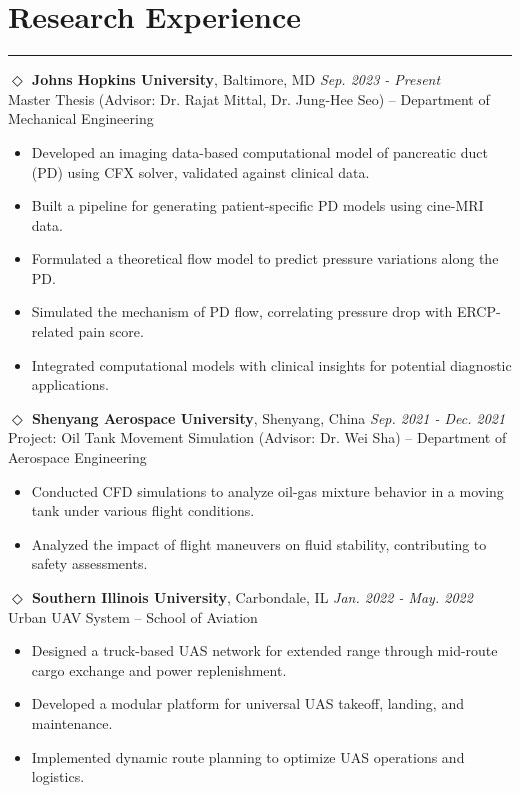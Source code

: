 \documentclass[11pt]{article}
\begin{document}
\section*{Research Experience}
\hrule

\noindent  \textbf{$\Diamond$ Johns Hopkins University}, Baltimore, MD \hfill \textit{Sep. 2023 - Present} \\
Master Thesis (Advisor: Dr. Rajat Mittal, Dr. Jung-Hee Seo) – Department of Mechanical Engineering
\begin{itemize}[leftmargin=*,itemsep=1pt]

    \item Developed an imaging data-based computational model of pancreatic duct (PD) using CFX solver, validated against clinical data. 
    \item Built a pipeline for generating patient-specific PD models using cine-MRI data.
    \item Formulated a theoretical flow model to predict pressure variations along the PD. 
    \item Simulated the mechanism of PD flow, correlating pressure drop with ERCP-related pain score.
    \item Integrated computational models with clinical insights for potential diagnostic applications. 

\end{itemize}


\noindent\textbf{$\Diamond$ Shenyang Aerospace University}, Shenyang, China \hfill \textit{Sep. 2021 - Dec. 2021} \\
Project: Oil Tank Movement Simulation (Advisor: Dr. Wei Sha) – Department of Aerospace Engineering 
\begin{itemize}[leftmargin=*,itemsep=1pt] 
    \item Conducted CFD simulations to analyze oil-gas mixture behavior in a moving tank under various flight conditions. 
    \item Analyzed the impact of flight maneuvers on fluid stability, contributing to safety assessments. 
\end{itemize}

\noindent\textbf{$\Diamond$ Southern Illinois University}, Carbondale, IL \hfill \textit{Jan. 2022 - May. 2022} \\
Urban UAV System – School of Aviation
\begin{itemize}[leftmargin=*,itemsep=1pt]
    \item Designed a truck-based UAS network 
    for extended range through mid-route cargo 
    exchange and power replenishment. 
    \item Developed a modular platform for universal 
    UAS takeoff, landing, and maintenance. 
    \item Implemented dynamic route planning to optimize 
    UAS operations and logistics. 
\end{itemize}
\end{document}
